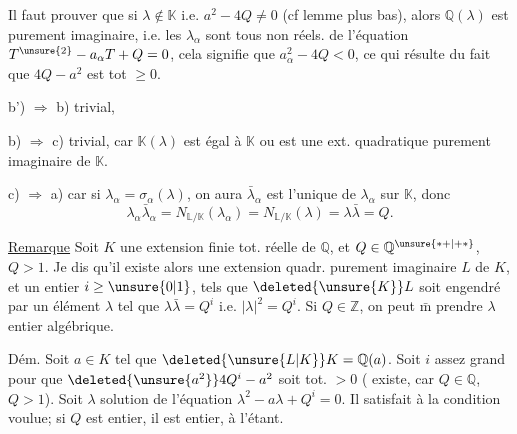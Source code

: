  Il faut prouver que si $\lambda\notin\mathbb K$ i.e. $a^2-4Q\ne0$ (cf lemme
plus bas), alors  $\mathbb Q(\lambda)$ est purement imaginaire, i.e.
les $\lambda_\alpha$ sont tous non réels.  
de l'équation $T^{\unsure{2}}-a_\alpha T+Q=0$, cela signifie que
$a_\alpha^2-4Q<0$, ce qui résulte du fait que $4Q-a^2$ est tot $\ge0$.

b') $\Rightarrow$ b) trivial, 

b) $\Longrightarrow$ c) trivial, car $\mathbb K(\lambda)$ est égal à $\mathbb K$ ou est une ext.
quadratique purement imaginaire de $\mathbb K$.

c) $\Longrightarrow$ a) car si $\lambda_\alpha=\sigma_\alpha(\lambda)$, on aura  
$\bar\lambda_\alpha$ est l'unique   de $\lambda_\alpha$ sur $\mathbb K$,  donc
\[
\lambda_\alpha\bar\lambda_\alpha=N_{\mathbb L/\mathbb K}(\lambda_\alpha)=N_{\mathbb L/\mathbb K}(\lambda)=\lambda\bar\lambda=Q.
\]


\uline{Remarque} Soit $K$ une extension finie tot. réelle de $\mathbb Q$,
et $Q\in\mathbb Q^{\unsure{*+|+*}}$, $Q>1$. Je dis qu'il existe alors une extension quadr.
purement imaginaire $L$ de $K$,  et un
entier $i\ge\unsure{0|1}$,  tels que $\deleted{\unsure{K}}L$ soit engendré
 par un élément $\lambda$ tel que $\lambda\bar\lambda=Q^i$ i.e. $|\lambda|^2=Q^i$.
Si $Q\in\mathbb Z$, on peut $\bar{\mathrm m}$ prendre $\lambda$ entier algébrique.

Dém. Soit $a\in K$ tel que $\deleted{\unsure{L|K}}K=\mathbb Q(a)$.  Soit
$i$ assez grand pour que $\deleted{\unsure{a^2}}4Q^i-a^2$ soit tot. $>0$
( existe, car $Q\in\mathbb Q$, $Q>1$). Soit $\lambda$ solution
de l'équation $\lambda^2-a\lambda+Q^i=0$. Il satisfait à la
condition voulue; si $Q$ est entier, il est entier, à l'étant.
